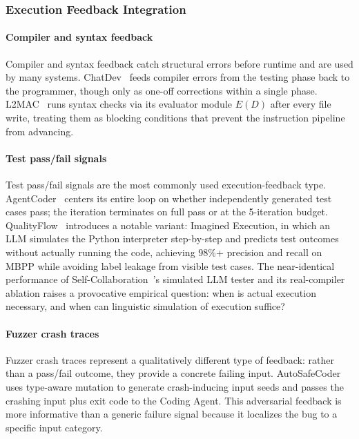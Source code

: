 \subsubsection{Execution Feedback Integration}
\paragraph{Compiler and syntax feedback} Compiler and syntax
feedback catch structural errors before runtime and are used by
many systems. ChatDev~\cite{Qian2023ChatDev} feeds compiler
errors from the testing phase back to the programmer, though only
as one-off corrections within a single phase.
L2MAC~\cite{Holt2023L2MAC} runs syntax checks via its evaluator
module $E(D)$ after every file write, treating them as blocking
conditions that prevent the instruction pipeline from advancing.

\paragraph{Test pass/fail signals} Test pass/fail signals are the
most commonly used execution-feedback type.
AgentCoder~\cite{huang2023agentcoder} centers its entire loop on
whether independently generated test cases pass; the iteration
terminates on full pass or at the 5-iteration budget.
QualityFlow~\cite{Hu2025QualityFlow} introduces a notable
variant: Imagined Execution, in which an LLM simulates the Python
interpreter step-by-step and predicts test outcomes without
actually running the code, achieving 98\%+ precision and recall
on MBPP while avoiding label leakage from visible test cases.
The near-identical performance of
Self-Collaboration~\cite{Dong2024SelfCollaboration}'s simulated
LLM tester and its real-compiler ablation raises a provocative
empirical question: when is actual execution necessary, and when
can linguistic simulation of execution suffice?

\paragraph{Fuzzer crash traces} Fuzzer crash traces represent a
qualitatively different type of feedback: rather than a pass/fail
outcome, they provide a concrete failing input.
AutoSafeCoder~\cite{Nunez2024AutoSafeCoder} uses type-aware
mutation to generate crash-inducing input seeds and passes the
crashing input plus exit code to the Coding Agent. This
adversarial feedback is more informative than a generic failure
signal because it localizes the bug to a specific input category.

